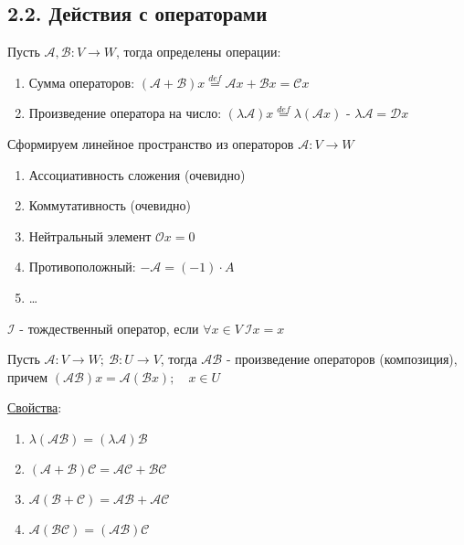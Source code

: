 \documentclass[12pt]{article}
\begin{document}
    \subsection{2.2. Действия с операторами}

    \Def Пусть $\mathcal{A}, \mathcal{B}: V \rightarrow W$, тогда определены операции:

    \begin{enumerate}
        \item Сумма операторов: $(\mathcal{A} + \mathcal{B})x \stackrel{def}{=} \mathcal{A}x + \mathcal{B}x = \mathcal{C}x$
        \item Произведение оператора на число: $(\lambda\mathcal{A})x \stackrel{def}{=} \lambda(\mathcal{A}x)$ - $\lambda\mathcal{A} = \mathcal{D}x$
    \end{enumerate}

    \Nota Сформируем линейное пространство из операторов $\mathcal{A}: V \rightarrow W$

    \begin{enumerate}
        \item Ассоциативность сложения (очевидно)
        \item Коммутативность (очевидно)
        \item Нейтральный элемент $\mathcal{O}x = 0$
        \item Противоположный: $-\mathcal{A} = (-1) \cdot A$
        \item \dots \Lab
    \end{enumerate}

    \Def $\mathcal{I}$ - тождественный оператор, если $\forall x \in V \ \mathcal{I}x = x$


    \Def Пусть $\mathcal{A} : V \rightarrow W; \ \mathcal{B} : U \rightarrow V$, тогда 
    $\mathcal{A}\mathcal{B}$ - произведение операторов (композиция), причем
    $(\mathcal{A}\mathcal{B}) x = \mathcal{A}(\mathcal{B}x); \quad x \in U$

    \hypertarget{linearoperatorproperties}{}

    \underline{Свойства}: 

    \begin{enumerate}[label*=\arabic*$^\circ$]
        \item $\lambda (\mathcal{A}\mathcal{B}) = (\lambda \mathcal{A})\mathcal{B}$

        \item $(\mathcal{A} + \mathcal{B}) \mathcal{C} = \mathcal{A}\mathcal{C} + \mathcal{B}\mathcal{C}$

        \item $\mathcal{A} (\mathcal{B} + \mathcal{C}) = \mathcal{A}\mathcal{B} + \mathcal{A}\mathcal{C}$

        \item $\mathcal{A} (\mathcal{B}\mathcal{C}) = (\mathcal{A}\mathcal{B}) \mathcal{C}$
    \end{enumerate}
\end{document}
